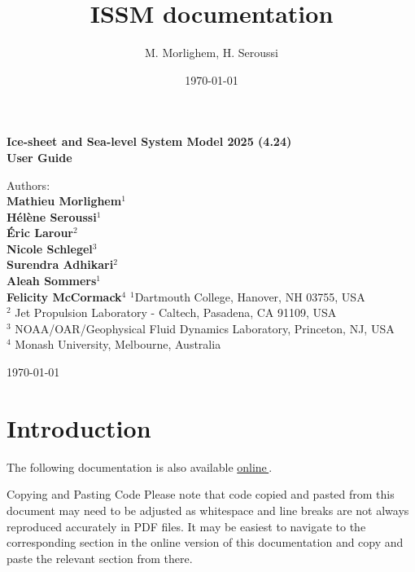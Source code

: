 \documentclass[letterpaper]{report}
\title{ISSM documentation}
\author{M. Morlighem, H. Seroussi}
\date{\today}
\newcommand{\documentationUrl}{https://tidbitsoftware.github.io/test_just_the_docs}
\let\orighref\href
\renewcommand{\href}[2]{\orighref{#1}{#2\,\faExternalLink}}
\begin{document}
\thispagestyle{empty}

\vspace{13cm}
\begin{center}
\bf \LARGE Ice-sheet and Sea-level System Model 2025 (4.24)\\
User Guide
\end{center}
\vfill
\begin{center}
Authors:\\
\vspace{.5cm}
{\bf \large Mathieu Morlighem$^{1}$} \\
\medskip
{\bf \large H\'el\`ene Seroussi$^{1}$}\\
\medskip
{\bf \large \'Eric Larour$^{2}$}\\
\medskip
{\bf \large Nicole Schlegel$^{3}$}\\
\medskip
{\bf \large Surendra Adhikari$^{2}$}\\
\medskip
{\bf \large Aleah Sommers$^{1}$}\\
\medskip
{\bf \large Felicity McCormack$^{4}$}
\vfill
$^{1}$Dartmouth College, Hanover, NH 03755, USA\\
\vspace{.2cm}
$^{2}$ Jet Propulsion Laboratory - Caltech, Pasadena, CA 91109, USA\\
\vspace{.2cm}
$^{3}$ NOAA/OAR/Geophysical Fluid Dynamics Laboratory, Princeton, NJ, USA \\
\vspace{.2cm}
$^{4}$ Monash University, Melbourne, Australia
\vspace{1cm}

\today
\end{center}

\cleardoublepage
\tableofcontents


\chapter{Introduction}
The following documentation is also available \href{\documentationUrl}{online}.

\begin{calloutHighlight}{Copying and Pasting Code}
Please note that code copied and pasted from this document may need to be adjusted as whitespace and line breaks are not always reproduced accurately in PDF files. It may be easiest to navigate to the corresponding section in the online version of this documentation and copy and paste the relevant section from there.
\end{calloutHighlight}
\end{document}
